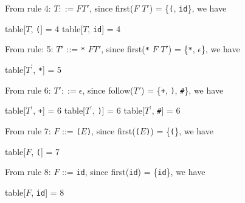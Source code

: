 \documentclass[8pt,a4paper,compress]{beamer}
\newcommand{\mm}[1]{$#1$}
\newcommand{\expo}[2]{$#1^{#2}$}
\newenvironment{spaced}
{
\smallskip
\hspace{.5cm}
\begin{minipage}[c]{\textwidth}
}
{
\end{minipage}
\smallskip
}
\begin{document}
\begin{frame}[fragile]
\pause

From rule 4: $T  ::= F T'$, since first($F$ $T'$) = \{\lstinline{(}, \lstinline{id}\}, we have

\text{ }
\begin{spaced}
\begin{production}
table[\mm{T}, \lstinline{(}] = 4
table[\mm{T}, \lstinline{id}] = 4
\end{production}
\end{spaced}

\pause
\bigskip

From rule: 5: $T'$ ::= \lstinline{*} $F T'$, since first(\lstinline{*} $F$ $T'$) = \{\lstinline{*}, $\epsilon$\}, we have

\text{ }
\begin{spaced}
\begin{production}
table[\expo{T}{\prime}, \lstinline{*}] = 5
\end{production}
\end{spaced}

\pause

From rule 6: $T' ::= \epsilon$, since follow($T'$) = \{\lstinline{+}, \lstinline{)}, \lstinline{#}\}, we have

\text{ }
\begin{spaced}
\begin{production}
table[\expo{T}{\prime}, \lstinline{+}] = 6
table[\expo{T}{\prime}, \lstinline{)}] = 6
table[\expo{T}{\prime}, \lstinline{#}] = 6
\end{production}
\end{spaced}

\pause

From rule 7: $F$  ::= \lstinline{(}$E$\lstinline{)}, since first(\lstinline{(}$E$\lstinline{)}) = \{\lstinline{(}\}, we have

\text{ }
\begin{spaced}
\begin{production}
table[\mm{F}, \lstinline{(}] = 7
\end{production}
\end{spaced}

\pause

From rule 8: $F$  ::= \lstinline{id}, since first(\lstinline{id}) = \{\lstinline{id}\}, we have

\text{ }
\begin{spaced}
\begin{production}
table[\mm{F}, \lstinline{id}] = 8
\end{production}
\end{spaced}
\end{frame}
\end{document}
